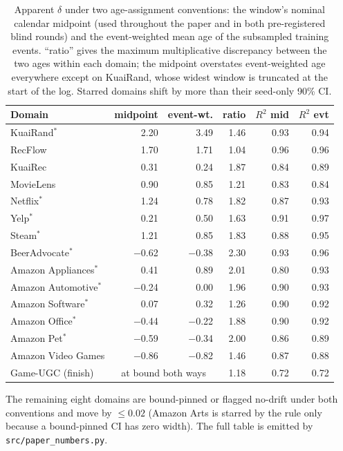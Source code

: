 \documentclass[10pt,letterpaper]{article}
\begin{document}
\begin{table}[t]
\centering
\caption{Apparent $\delta$ under two age-assignment conventions: the
window's nominal calendar midpoint (used throughout the paper and in both
pre-registered blind rounds) and the event-weighted mean age of the
subsampled training events. ``ratio'' gives the maximum multiplicative
discrepancy between the two ages within each domain; the midpoint overstates event-weighted age everywhere except on
KuaiRand, whose widest window is truncated at the start of the log. Starred domains
shift by more than their seed-only 90\% CI.}
\label{tab:agewt}
\small
\begin{tabular}{lrrrrr}
\toprule
Domain & midpoint & event-wt. & ratio & $R^2$ mid & $R^2$ evt \\
\midrule
KuaiRand$^{\ast}$   & 2.20 & 3.49 & 1.46 & 0.93 & 0.94 \\
RecFlow             & 1.70 & 1.71 & 1.04 & 0.96 & 0.96 \\
KuaiRec             & 0.31 & 0.24 & 1.87 & 0.84 & 0.89 \\
MovieLens           & 0.90 & 0.85 & 1.21 & 0.83 & 0.84 \\
Netflix$^{\ast}$    & 1.24 & 0.78 & 1.82 & 0.87 & 0.93 \\
Yelp$^{\ast}$       & 0.21 & 0.50 & 1.63 & 0.91 & 0.97 \\
Steam$^{\ast}$      & 1.21 & 0.85 & 1.83 & 0.88 & 0.95 \\
BeerAdvocate$^{\ast}$ & $-$0.62 & $-$0.38 & 2.30 & 0.93 & 0.96 \\
Amazon Appliances$^{\ast}$ & 0.41 & 0.89 & 2.01 & 0.80 & 0.93 \\
Amazon Automotive$^{\ast}$ & $-$0.24 & 0.00 & 1.96 & 0.90 & 0.93 \\
Amazon Software$^{\ast}$ & 0.07 & 0.32 & 1.26 & 0.90 & 0.92 \\
Amazon Office$^{\ast}$ & $-$0.44 & $-$0.22 & 1.88 & 0.90 & 0.92 \\
Amazon Pet$^{\ast}$ & $-$0.59 & $-$0.34 & 2.00 & 0.86 & 0.89 \\
Amazon Video Games  & $-$0.86 & $-$0.82 & 1.46 & 0.87 & 0.88 \\
Game-UGC (finish)   & \multicolumn{2}{c}{at bound both ways} & 1.18 & 0.72 & 0.72 \\
\bottomrule
\end{tabular}

\smallskip
{\footnotesize The remaining eight domains are bound-pinned or flagged
no-drift under both conventions and move by $\le 0.02$ (Amazon Arts is
starred by the rule only because a bound-pinned CI has zero width). The full
table is emitted by \texttt{src/paper\_numbers.py}.}
\end{table}
\end{document}
